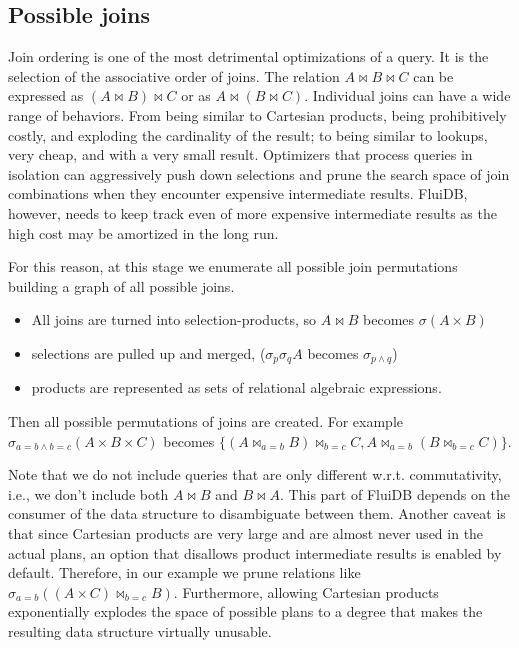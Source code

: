 \subsection{Possible joins}
\label{sec:possible_joins}

Join ordering is one of the most detrimental optimizations of a query.
It is the selection of the associative order of joins.  The relation
\(A \Join B \Join C\) can be expressed as \((A \Join B) \Join C\) or as
\(A \Join (B \Join C)\).  Individual joins can have a wide range of
behaviors. From being similar to Cartesian products, being
prohibitively costly, and exploding the cardinality of the result; to
being similar to lookups, very cheap, and with a very small result.
Optimizers that process queries in isolation can aggressively push
down selections and prune the search space of join combinations when
they encounter expensive intermediate results.  FluiDB, however, needs
to keep track even of more expensive intermediate results as the high
cost may be amortized in the long run.

For this reason, at this stage we enumerate all possible join
permutations building a graph of all possible joins.

\begin{itemize}
\item All joins are turned into selection-products, so \(A \Join B\)
becomes \(\sigma(A \times B)\)
\item selections are pulled up and merged, (\(\sigma_p \sigma_q A\)
becomes \(\sigma_{p \land q}\))
\item products are represented as sets of relational algebraic
expressions.
\end{itemize}

Then all possible permutations of joins are created. For example
\(\sigma_{a=b \land b=c}(A \times B \times C)\) becomes \(\{(A
\Join_{a=b} B) \Join_{b=c} C, A \Join_{a=b} (B \Join_{b=c} C)\}\).

Note that we do not include queries that are only different
w.r.t. commutativity, i.e., we don't include both \(A \Join B\) and
\(B \Join A\). This part of FluiDB depends on the consumer of the data
structure to disambiguate between them. Another caveat is that since
Cartesian products are very large and are almost never used in the
actual plans, an option that disallows product intermediate results is
enabled by default. Therefore, in our example we prune relations like
\(\sigma_{a=b}((A \times C) \Join_{b=c}B)\). Furthermore, allowing
Cartesian products exponentially explodes the space of possible plans
to a degree that makes the resulting data structure virtually
unusable.

